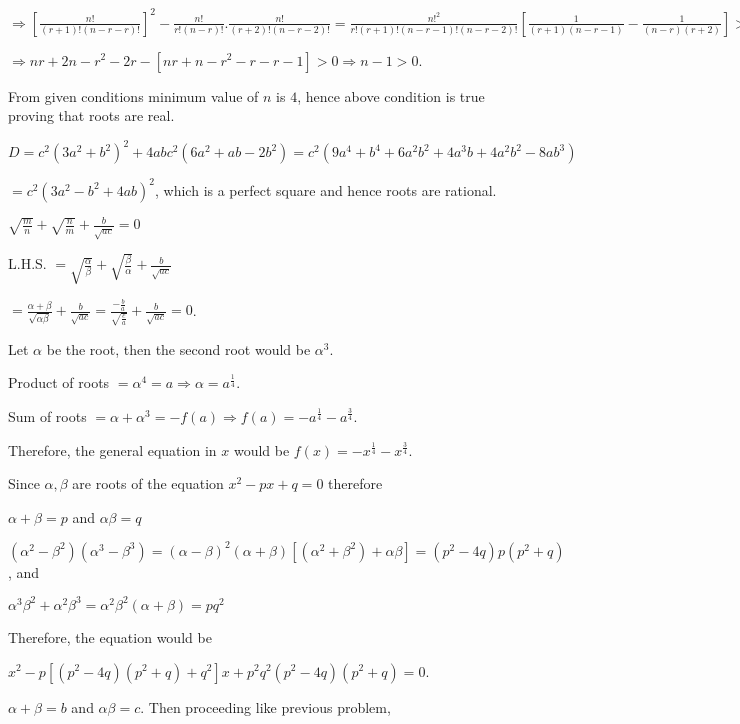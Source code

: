   $\Rightarrow \left[\frac{n!}{(r + 1)!(n - r - r)!}\right]^2 - \frac{n!}{r!(n - r)!}.\frac{n!}{(r + 2)!(n -
    r - 2)!} = \frac{n!^2}{r!(r + 1)!(n - r - 1)!(n - r - 2)!}\left[\frac{1}{(r + 1)(n - r - 1)} -
    \frac{1}{(n - r)(r + 2)}\right] > 0$

  $\Rightarrow nr + 2n - r^2 - 2r - [nr + n - r^2 - r - r - 1] > 0 \Rightarrow n - 1 > 0$.

  From given conditions minimum value of $n$ is $4$, hence above condition is true proving that roots are
  real.
\item $D = c^2(3a^2 + b^2)^2 + 4abc^2(6a^2 + ab - 2b^2) = c^2(9a^4 + b^4 + 6a^2b^2 + 4a^3b + 4a^2b^2 - 8ab^3)$

  $= c^2(3a^2 - b^2 + 4ab)^2$, which is a perfect square and hence roots are rational.
\item $\sqrt{\frac{m}{n}} + \sqrt{\frac{n}{m}} + \frac{b}{\sqrt{ac}} = 0$

  L.H.S. $= \sqrt{\frac{\alpha}{\beta}} + \sqrt{\frac{\beta}{\alpha}} + \frac{b}{\sqrt{ac}}$

  $= \frac{\alpha + \beta}{\sqrt{\alpha\beta}} + \frac{b}{\sqrt{ac}} =
  \frac{-\frac{b}{a}}{\sqrt{\frac{c}{a}}} + \frac{b}{\sqrt{ac}} = 0$.
\item Let $\alpha$ be the root, then the second root would be $\alpha^3$.

  Product of roots $= \alpha^4 = a \Rightarrow \alpha = a^{\frac{1}{4}}$.

  Sum of roots $= \alpha + \alpha^3 = -f(a)\Rightarrow f(a) = -a^{\frac{1}{4}} - a^{\frac{3}{4}}$.

  Therefore, the general equation in $x$ would be $f(x) = -x^{\frac{1}{4}} - x^{\frac{3}{4}}$.
\item Since $\alpha, \beta$ are roots of the equation $x^2 - px + q = 0$ therefore

  $\alpha + \beta = p$ and $\alpha\beta = q$

  $(\alpha^2 - \beta^2)(\alpha^3 - \beta^3) = (\alpha - \beta)^2(\alpha + \beta)[(\alpha^2 + \beta^2) +
  \alpha\beta] =(p^2 - 4q)p(p^2 + q)$, and

  $\alpha^3\beta^2 + \alpha^2\beta^3 = \alpha^2\beta^2(\alpha + \beta) = pq^2$

  Therefore, the equation would be

  $x^2 - p[(p^2 - 4q)(p^2 + q) + q^2]x + p^2q^2(p^2 - 4q)(p^2 + q) = 0$.
\item $\alpha + \beta = b$ and $\alpha\beta = c$. Then proceeding like previous problem,

